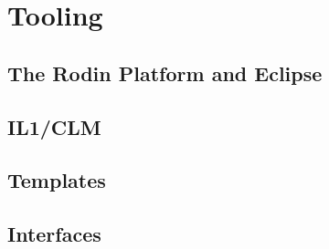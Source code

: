 \section{Tooling}

\subsection{The Rodin Platform and Eclipse}

\subsection{IL1/CLM}

\subsection{Templates}

\subsection{Interfaces}